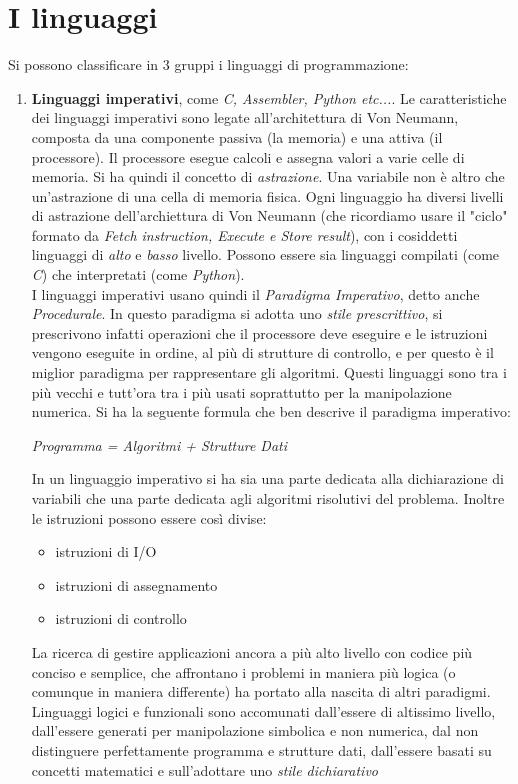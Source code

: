 \documentclass[a4paper,12pt, oneside]{book}
\begin{document}
\chapter{I linguaggi}
Si possono classificare in 3 gruppi i linguaggi di programmazione:
\begin{enumerate}
\item \textbf{Linguaggi imperativi}, come \textit{C, Assembler, Python etc...}. Le caratteristiche dei linguaggi imperativi sono legate all'architettura di Von Neumann, composta da una componente passiva (la memoria) e una attiva (il processore). Il processore esegue calcoli e assegna valori a varie celle di memoria. Si ha quindi il concetto di \textit{astrazione}. Una variabile non è altro che un'astrazione di una cella di memoria fisica. Ogni linguaggio ha diversi livelli di astrazione dell'archiettura di Von Neumann (che ricordiamo usare il "ciclo" formato da \textit{Fetch instruction, Execute e Store result}), con i cosiddetti linguaggi di \textit{alto} e \textit{basso} livello. Possono essere sia linguaggi compilati (come \textit{C}) che interpretati (come \textit{Python}).\\
I linguaggi imperativi usano quindi il \textit{Paradigma Imperativo}, detto anche \textit{Procedurale}. In questo paradigma si adotta uno \textit{stile prescrittivo}, si prescrivono infatti operazioni che il processore deve eseguire e le istruzioni vengono eseguite in ordine, al più di strutture di controllo, e per questo è il miglior paradigma per rappresentare gli algoritmi. Questi linguaggi sono tra i più vecchi e tutt'ora tra i più usati soprattutto per la manipolazione numerica. Si ha la seguente formula che ben descrive il paradigma imperativo:
\begin{center}
\textit{Programma = Algoritmi + Strutture Dati}
\end{center}
In un linguaggio imperativo si ha sia una parte dedicata alla dichiarazione di variabili che una parte dedicata agli algoritmi risolutivi del problema. Inoltre le istruzioni possono essere così divise:
\begin{itemize}
\item istruzioni di I/O
\item istruzioni di assegnamento
\item istruzioni di controllo
\end{itemize}
La ricerca di gestire applicazioni ancora a più alto livello con codice più conciso e semplice, che affrontano i problemi in maniera più logica (o comunque in maniera differente) ha portato alla nascita di altri paradigmi. Linguaggi logici e funzionali sono accomunati dall'essere di altissimo livello, dall'essere generati per manipolazione simbolica e non numerica, dal non distinguere perfettamente programma e strutture dati, dall'essere basati su concetti matematici e sull'adottare uno \textit{stile dichiarativo}

\end{enumerate}
\end{document}
